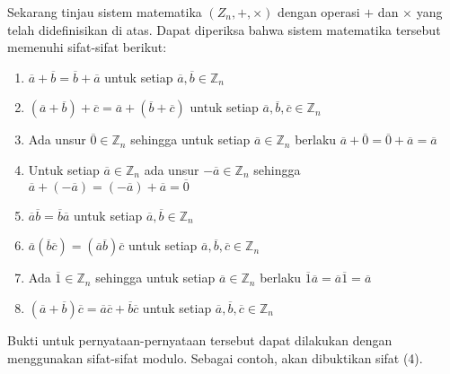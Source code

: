 	Sekarang tinjau sistem matematika $(Z_n, +, \times)$ dengan operasi $+$ dan $\times$ yang telah didefinisikan di atas. Dapat diperiksa bahwa sistem matematika tersebut memenuhi sifat-sifat berikut:
	\begin{enumerate}
		\item $\overline{a} + \overline{b} = \overline{b} + \overline{a}$ untuk setiap $\overline{a}, \overline{b} \in \mathbb{Z}_n$
		\item $(\overline{a} + \overline{b}) + \overline{c} = \overline{a} + (\overline{b} + \overline{c})$ untuk setiap $\overline{a}, \overline{b}, \overline{c} \in \mathbb{Z}_n$
		\item Ada unsur $\overline{0} \in \mathbb{Z}_n$ sehingga untuk setiap $\overline{a} \in \mathbb{Z}_n$ berlaku $\overline{a} + \overline{0} = \overline{0} + \overline{a} = \overline{a}$
		\item Untuk setiap $\overline{a} \in \mathbb{Z}_n$ ada unsur $-\overline{a} \in \mathbb{Z}_n$ sehingga $\overline{a} + (-\overline{a}) = (-\overline{a}) + \overline{a} = \overline{0}$
		\item $\overline{a} \overline{b} = \overline{b} \overline{a}$ untuk setiap $\overline{a}, \overline{b} \in \mathbb{Z}_n$
		\item $\overline{a}(\overline{b}\overline{c}) = (\overline{a} \overline{b})\overline{c}$ untuk setiap $\overline{a},\overline{b},\overline{c} \in \mathbb{Z}_n$
		\item Ada $\overline{1} \in \mathbb{Z}_n$ sehingga untuk setiap $\overline{a} \in \mathbb{Z}_n$ berlaku $\overline{1}\overline{a} = \overline{a}\overline{1} = \overline{a}$
		\item $(\overline{a} + \overline{b})\overline{c} = \overline{a}\overline{c} + \overline{b}\overline{c}$ untuk setiap $\overline{a},\overline{b},\overline{c} \in \mathbb{Z}_n$
	\end{enumerate}
	Bukti untuk pernyataan-pernyataan tersebut dapat dilakukan dengan menggunakan sifat-sifat modulo. Sebagai contoh, akan dibuktikan sifat (4).
	\\
	
